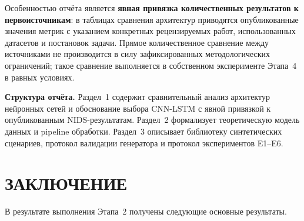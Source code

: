 \documentclass[14pt, a4paper]{extarticle}
\begin{document}
Особенностью отчёта является \textbf{явная привязка количественных
результатов к первоисточникам}: в таблицах сравнения архитектур
приводятся опубликованные значения метрик с указанием конкретных
рецензируемых работ, использованных датасетов и постановок задачи.
Прямое количественное сравнение между источниками не производится в силу
зафиксированных методологических ограничений; такое сравнение
выполняется в собственном эксперименте Этапа~4 в равных условиях.

\textbf{Структура отчёта.} Раздел~1 содержит сравнительный анализ
архитектур нейронных сетей и обоснование выбора CNN-LSTM с явной
привязкой к опубликованным NIDS-результатам. Раздел~2 формализует
теоретическую модель данных и pipeline обработки. Раздел~3 описывает
библиотеку синтетических сценариев, протокол валидации генератора и
протокол экспериментов E1--E6.

\newpage





\section*{ЗАКЛЮЧЕНИЕ}

В результате выполнения Этапа~2 получены следующие основные результаты.
\end{document}
